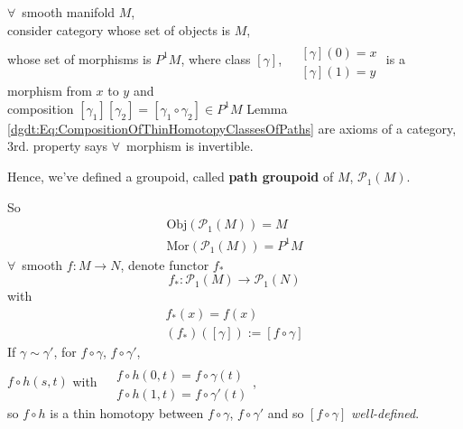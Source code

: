 \begin{definition}
	$\forall \, $ smooth manifold $M$, \\
	consider category whose set of objects is $M$, \\
	whose set of morphisms is $P^1M$, where class $[\gamma]$, $\begin{aligned} & \qquad \\ 
	& [\gamma](0) = x \\
	& [\gamma](1) = y \end{aligned}$ is a morphism from $x$ to $y$ and \\
	composition $[\gamma_1 ][\gamma_2] = [\gamma_1 \circ \gamma_2] \in P^1M$  
	Lemma \ref{dgdt:Eq:CompositionOfThinHomotopyClassesOfPaths} are axioms of a category, 3rd. property says $\forall \,$ morphism is invertible.  
	
	Hence, we've defined a groupoid, called \textbf{path groupoid} of $M$, $\mathcal{P}_1(M)$. 
\end{definition}

So 
\[
\begin{gathered}
\text{Obj}(\mathcal{P}_1(M)) = M \\
\text{Mor}(\mathcal{P}_1(M)) = P^1M
\end{gathered}
\]
$\forall \, $ smooth $f:M \to N$, denote functor $f_*$
\begin{equation}
f_* : \mathcal{P}_1(M) \to \mathcal{P}_1(N)
\end{equation}
with 
\[
\begin{gathered}
f_*(x) = f(x) \\
(f_*)([\gamma]) := [f\circ \gamma]
\end{gathered}
\]
If $\gamma \sim \gamma'$, for $f\circ \gamma$, $f\circ \gamma'$, \\
$f\circ h(s,t) $ with $\begin{aligned} & \quad \\ 
& f\circ h(0,t) = f\circ \gamma(t) \\
& f\circ h(1,t) = f\circ \gamma'(t) \end{aligned}$, \\
so $f\circ h$ is a thin homotopy between $f\circ \gamma$, $f\circ \gamma'$ and so $[f\circ \gamma]$ \emph{well-defined}.




